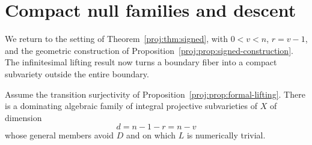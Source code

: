 \section{Compact null families and descent}
\label{proj:sg:descent}

We return to the setting of Theorem~\ref{proj:thm:signed}, with
$0<v<n$, $r=v-1$, and the geometric construction of
Proposition~\ref{proj:prop:signed-construction}.  The infinitesimal
lifting result now turns a boundary fiber into a compact
subvariety outside the entire boundary.

\begin{proposition}\label{proj:prop:null-family}
Assume the transition surjectivity of
Proposition~\ref{proj:prop:formal-lifting}.  There is a dominating
algebraic family of integral projective subvarieties of $X$
of dimension
\[
 d=n-1-r=n-v
\]
whose general members avoid $D$ and on which $L$ is
numerically trivial.
\end{proposition}

